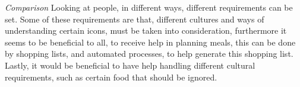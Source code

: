 \emph{Comparison}
Looking at people, in different ways, different requirements can be set. Some of these requirements are that, different cultures and ways of understanding certain icons, must be taken into consideration, furthermore it seems to be beneficial to all, to receive help in planning meals, this can be done by shopping lists, and automated processes, to help generate this shopping list. Lastly, it would be beneficial to have help handling different cultural requirements, such as certain food that should be ignored. 